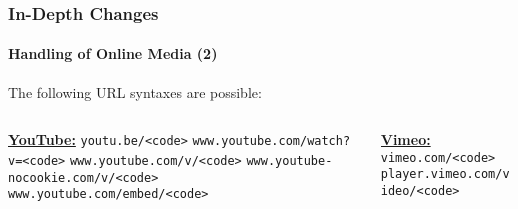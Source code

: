 \begin{frame}[fragile]
	\frametitle{In-Depth Changes}
	\framesubtitle{Handling of Online Media (2)}

	The following URL syntaxes are possible:
	\vspace{0.4cm}

	\begin{columns}[T]
		\begin{column}{.52\textwidth}
			\smaller
				\tabto{0.2cm}\textbf{\underline{YouTube:}}\newline
				\tabto{0.2cm}\texttt{youtu.be/<code>}\newline
				\tabto{0.2cm}\texttt{www.youtube.com/watch?v=<code>}\newline
				\tabto{0.2cm}\texttt{www.youtube.com/v/<code>}\newline
				\tabto{0.2cm}\texttt{www.youtube-nocookie.com/v/<code>}\newline
				\tabto{0.2cm}\texttt{www.youtube.com/embed/<code>}\newline
		\end{column}
		\begin{column}{.48\textwidth}
			\vspace{-0.25cm}\smaller
				\textbf{\underline{Vimeo:}}\newline
				\texttt{vimeo.com/<code>}\newline
				\texttt{player.vimeo.com/video/<code>}\newline
		\end{column}
	\end{columns}

\end{frame}


